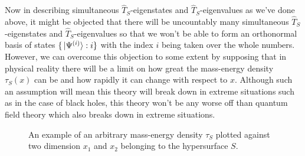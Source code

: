 Now in describing simultaneous $\hat{T}_S$-eigenstates and  $\hat{T}_S$-eigenvalues as we've done above, it might be objected that there will be uncountably many simultaneous $\hat{T}_S$-eigenstates and  $\hat{T}_S$-eigenvalues so that we won't be able to form an orthonormal basis of states $\{\ket*{\Psi^{(i)}}:i\}$ with the index $i$ being taken over the whole numbers. However, we can overcome this objection to some extent by supposing that in physical reality there will be a limit on how great the mass-energy density $\tau_S(x)$ can be and how rapidly it can change with respect to $x$. Although such an assumption will mean this theory will break down in extreme situations such as in the case of black holes, this theory won't be any worse off than quantum field theory which also breaks down in extreme situations.
\begin{figure}[ht!]
  \captionsetup{justification=justified}
  \centering
  
  \vspace*{2px}
  \caption{An example of an arbitrary mass-energy density $\tau_S$ plotted against two dimension $x_1$ and $x_2$ belonging to the hypersurface $S$. }\label{tauSexample}
  \end{figure}

